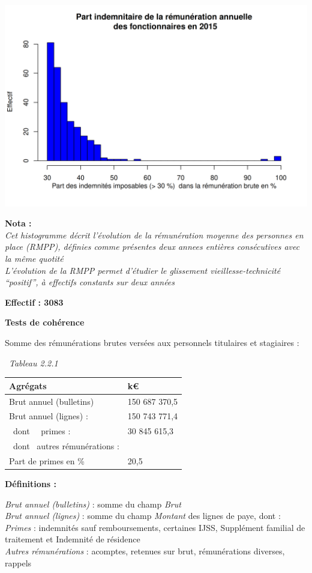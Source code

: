 \includegraphics{altair_files/figure-latex/unnamed-chunk-43-6.png}

\textbf{Nota :}\\
\emph{Cet histogramme décrit l'évolution de la rémunération moyenne des
personnes en place (RMPP), définies comme présentes deux annees entières
consécutives avec la même quotité}\\
\emph{L'évolution de la RMPP permet d'étudier le glissement
vieillesse-technicité ``positif'', à effectifs constants sur deux
années}

\textbf{Effectif : 3083 }

\textbf{Tests de cohérence}

Somme des rémunérations brutes versées aux personnels titulaires et
stagiaires :

~\emph{Tableau 2.2.1}

\begin{longtable}[]{@{}ll@{}}
\toprule
Agrégats & k€\tabularnewline
\midrule
\endhead
Brut annuel (bulletins) & 150 687 370,5\tabularnewline
Brut annuel (lignes) : & 150 743 771,4\tabularnewline
~dont ~~primes : & 30 845 615,3\tabularnewline
~dont ~autres rémunérations : &\tabularnewline
Part de primes en \% & 20,5\tabularnewline
\bottomrule
\end{longtable}

\textbf{Définitions :}

\emph{Brut annuel (bulletins)} : somme du champ \emph{Brut}\\
\emph{Brut annuel (lignes)} : somme du champ \emph{Montant} des lignes
de paye, dont :\\
\emph{Primes} : indemnités sauf remboursements, certaines IJSS,
Supplément familial de traitement et Indemnité de résidence\\
\emph{Autres rémunérations} : acomptes, retenues sur brut, rémunérations
diverses, rappels

